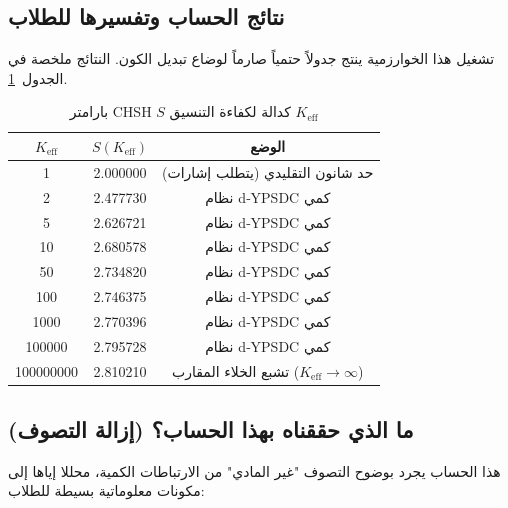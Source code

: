 \documentclass[11pt,a4paper]{article}
\begin{document}
	\subsection{نتائج الحساب وتفسيرها للطلاب}
	
	تشغيل هذا الخوارزمية ينتج جدولاً حتمياً صارماً لوضاع تبديل الكون. النتائج ملخصة في الجدول~\ref{tab:bell_yuct}.
	
	\begin{table}[htbp]
		\centering
		\small
		\setlength{\tabcolsep}{4pt}
		\caption{بارامتر CHSH \(S\) كدالة لكفاءة التنسيق \(K_{\mathrm{eff}}\)}
		\label{tab:bell_yuct}
		\begin{tabular}{ccc}
			\toprule
			\(K_{\mathrm{eff}}\) & \(S(K_{\mathrm{eff}})\) & الوضع \\
			\midrule
			1            & 2.000000 & حد شانون التقليدي (يتطلب إشارات) \\
			2            & 2.477730 & نظام d‑YPSDC كمي \\
			5            & 2.626721 & نظام d‑YPSDC كمي \\
			10           & 2.680578 & نظام d‑YPSDC كمي \\
			50           & 2.734820 & نظام d‑YPSDC كمي \\
			100          & 2.746375 & نظام d‑YPSDC كمي \\
			1000         & 2.770396 & نظام d‑YPSDC كمي \\
			100000       & 2.795728 & نظام d‑YPSDC كمي \\
			100000000    & 2.810210 & تشبع الخلاء المقارب (\(K_{\mathrm{eff}} \to \infty\)) \\
			\bottomrule
		\end{tabular}
	\end{table}
	
	\subsection{ما الذي حققناه بهذا الحساب؟ (إزالة التصوف)}
	
	هذا الحساب يجرد بوضوح التصوف "غير المادي" من الارتباطات الكمية، محللا إياها إلى مكونات معلوماتية بسيطة للطلاب:
	
\end{document}
